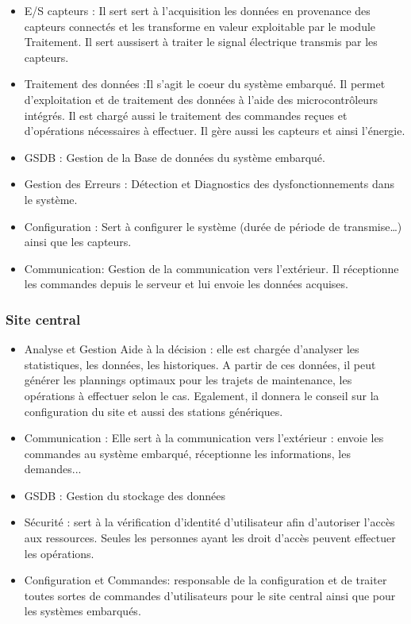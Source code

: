 	\begin{itemize}
	    \item E/S capteurs : Il sert sert à l'acquisition les données en provenance des capteurs connectés et les transforme en valeur exploitable par le module Traitement. Il sert aussisert à traiter le signal électrique transmis par les capteurs.
	    \item Traitement des données :Il s'agit le coeur du système embarqué.  Il permet d'exploitation et de traitement des données à l’aide des microcontrôleurs intégrés. Il est chargé aussi le traitement des commandes reçues et d'opérations nécessaires à effectuer. Il gère aussi les capteurs et ainsi l'énergie.
	    \item GSDB : Gestion de la Base de données du système embarqué. 
	    \item Gestion des Erreurs : Détection et Diagnostics des dysfonctionnements dans le système.
	    \item Configuration : Sert à configurer le système (durée de période de transmise…) ainsi que les capteurs.
	    \item Communication: Gestion de la communication vers l’extérieur. Il réceptionne les commandes depuis le serveur et lui envoie les données acquises. 
	\end{itemize}

\subsubsection{Site central}

	\begin{itemize}
	    \item Analyse et Gestion Aide à la décision : elle est chargée d’analyser les statistiques, les données, les historiques. A partir de ces données, il peut générer les plannings optimaux pour les trajets de maintenance, les opérations à effectuer selon le cas. Egalement, il donnera le conseil sur la configuration du site et aussi des stations génériques.
 
	    \item Communication : Elle sert à la communication vers l’extérieur : envoie les commandes au système embarqué, réceptionne les informations, les demandes... 
	    \item GSDB : Gestion du stockage des données
	    \item Sécurité : sert à la vérification d’identité d’utilisateur afin d’autoriser l’accès aux ressources. Seules les personnes ayant les droit d’accès peuvent effectuer les opérations.
		\item Configuration et Commandes: responsable de la configuration et de traiter toutes sortes de commandes d’utilisateurs pour le site central ainsi que pour les systèmes embarqués. 

	\end{itemize}

